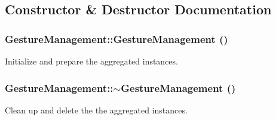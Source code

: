 \subsection{Constructor \& Destructor Documentation}
\hypertarget{classGestureManagement_add53dee17bdb4dc327d3a765fe54dab4}{
\subsubsection[{GestureManagement}]{\setlength{\rightskip}{0pt plus 5cm}GestureManagement::GestureManagement ()}}
\label{classGestureManagement_add53dee17bdb4dc327d3a765fe54dab4}
Initialize and prepare the aggregated instances. \hypertarget{classGestureManagement_ab4185a887ea40273198ac71b2ecb6bf1}{
\subsubsection[{$\sim$GestureManagement}]{\setlength{\rightskip}{0pt plus 5cm}GestureManagement::$\sim$GestureManagement ()}}
\label{classGestureManagement_ab4185a887ea40273198ac71b2ecb6bf1}
Clean up and delete the the aggregated instances. 

